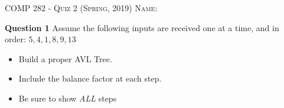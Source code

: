 \documentclass{letter}
\newcommand{\heading}[1]{{\large \textsc{#1}}}
\begin{document}
\heading{COMP 282 - Quiz 2 (Spring, 2019)}
\kern 2cm
\heading{Name:}

{\bf Question 1} \kern 1cm Assume the following inputs are received one at a
time, and in order: $5, 4, 1, 8, 9, 13$

\begin{itemize}
\item Build a proper AVL Tree.
\item Include the balance factor at each step.
\item Be sure to show {\em ALL} steps
\end{itemize}
\end{document}
